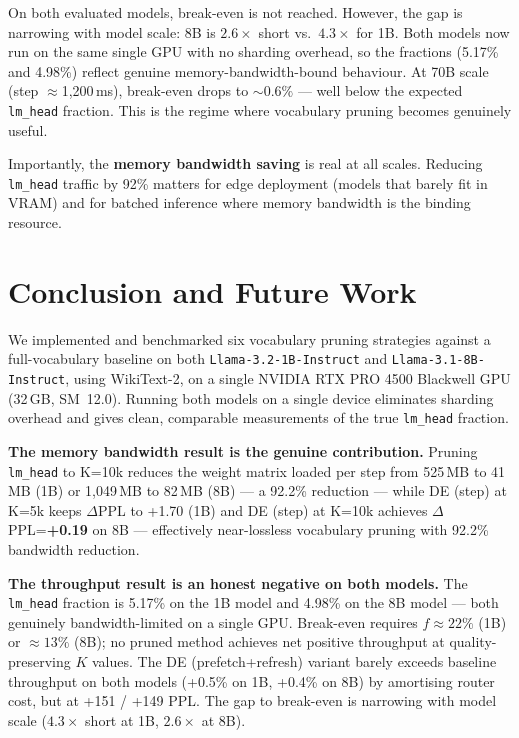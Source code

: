 \documentclass[twocolumn,10pt]{article}
\newcommand{\code}[1]{\texttt{#1}}
\begin{document}
On both evaluated models, break-even is not reached. However, the gap is
narrowing with model scale: 8B is $2.6\times$ short vs.\ $4.3\times$ for
1B. Both models now run on the same single GPU with no sharding overhead,
so the fractions (5.17\% and 4.98\%) reflect genuine memory-bandwidth-bound
behaviour. At 70B scale (step $\approx$1,200\,ms), break-even drops to
${\sim}0.6\%$ --- well below the expected \code{lm\_head} fraction. This is
the regime where vocabulary pruning becomes genuinely useful.

Importantly, the \textbf{memory bandwidth saving} is real at all scales.
Reducing \code{lm\_head} traffic by 92\% matters for edge deployment (models
that barely fit in VRAM) and for batched inference where memory bandwidth is
the binding resource.

\section{Conclusion and Future Work}
\label{sec:future}

We implemented and benchmarked six vocabulary pruning strategies against a
full-vocabulary baseline on both \code{Llama-3.2-1B-Instruct} and
\code{Llama-3.1-8B-Instruct}, using WikiText-2, on a single NVIDIA RTX PRO
4500 Blackwell GPU (32\,GB, SM~12.0). Running both models on a single device
eliminates sharding overhead and gives clean, comparable measurements of the
true \code{lm\_head} fraction.

\textbf{The memory bandwidth result is the genuine contribution.} Pruning
\code{lm\_head} to K=10k reduces the weight matrix loaded per step from
525\,MB to 41\,MB (1B) or 1,049\,MB to 82\,MB (8B) --- a 92.2\% reduction
--- while DE (step) at K=5k keeps $\Delta$PPL to +1.70 (1B) and
DE (step) at K=10k achieves $\Delta$PPL=\textbf{+0.19} on 8B --- effectively
near-lossless vocabulary pruning with 92.2\% bandwidth reduction.

\textbf{The throughput result is an honest negative on both models.} The
\code{lm\_head} fraction is 5.17\% on the 1B model and 4.98\% on the 8B
model --- both genuinely bandwidth-limited on a single GPU. Break-even
requires $f \approx 22\%$ (1B) or $\approx 13\%$ (8B); no pruned method
achieves net positive throughput at quality-preserving $K$ values. The DE
(prefetch+refresh) variant barely exceeds baseline throughput on both models
(+0.5\% on 1B, +0.4\% on 8B) by amortising router cost, but at +151 / +149
PPL. The gap to break-even is narrowing with model scale ($4.3\times$ short
at 1B, $2.6\times$ at 8B).
\end{document}
